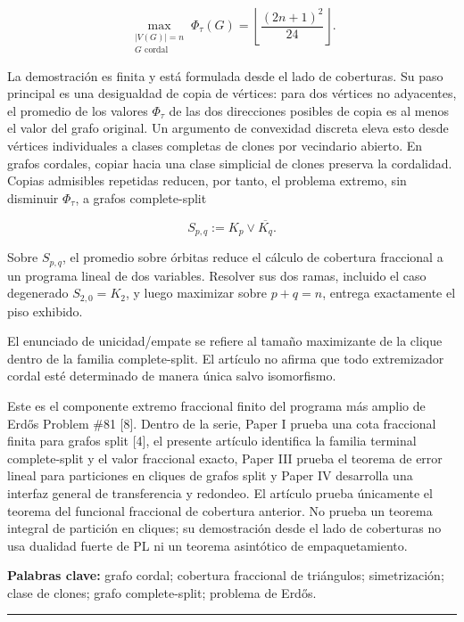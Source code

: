 \documentclass[
  spanish,
  11pt,
  a4paper,
]{article}
\begin{document}
\[
\boxed{
\max_{\substack{|V(G)|=n\\G\text{ cordal}}}
\Phi_\tau(G)
=
\left\lfloor\frac{(2n+1)^2}{24}\right\rfloor.
}
\]

La demostración es finita y está formulada desde el lado de coberturas. Su paso principal es una desigualdad de copia de vértices: para dos vértices no adyacentes, el promedio de los valores \(\Phi_\tau\) de las dos direcciones posibles de copia es al menos el valor del grafo original. Un argumento de convexidad discreta eleva esto desde vértices individuales a clases completas de clones por vecindario abierto. En grafos cordales, copiar hacia una clase simplicial de clones preserva la cordalidad. Copias admisibles repetidas reducen, por tanto, el problema extremo, sin disminuir \(\Phi_\tau\), a grafos complete-split

\[
S_{p,q}:=K_p\vee\overline{K_q}.
\]

Sobre \(S_{p,q}\), el promedio sobre órbitas reduce el cálculo de cobertura fraccional a un programa lineal de dos variables. Resolver sus dos ramas, incluido el caso degenerado \(S_{2,0}=K_2\), y luego maximizar sobre \(p+q=n\), entrega exactamente el piso exhibido.

El enunciado de unicidad/empate se refiere al tamaño maximizante de la clique dentro de la familia complete-split. El artículo no afirma que todo extremizador cordal esté determinado de manera única salvo isomorfismo.

Este es el componente extremo fraccional finito del programa más amplio de Erdős Problem \#81 {[}8{]}. Dentro de la serie, Paper I prueba una cota fraccional finita para grafos split {[}4{]}, el presente artículo identifica la familia terminal complete-split y el valor fraccional exacto, Paper III prueba el teorema de error lineal para particiones en cliques de grafos split y Paper IV desarrolla una interfaz general de transferencia y redondeo. El artículo prueba únicamente el teorema del funcional fraccional de cobertura anterior. No prueba un teorema integral de partición en cliques; su demostración desde el lado de coberturas no usa dualidad fuerte de PL ni un teorema asintótico de empaquetamiento.

\textbf{Palabras clave:} grafo cordal; cobertura fraccional de triángulos; simetrización; clase de clones; grafo complete-split; problema de Erdős.

\begin{center}\rule{0.5\linewidth}{0.5pt}\end{center}
\end{document}
